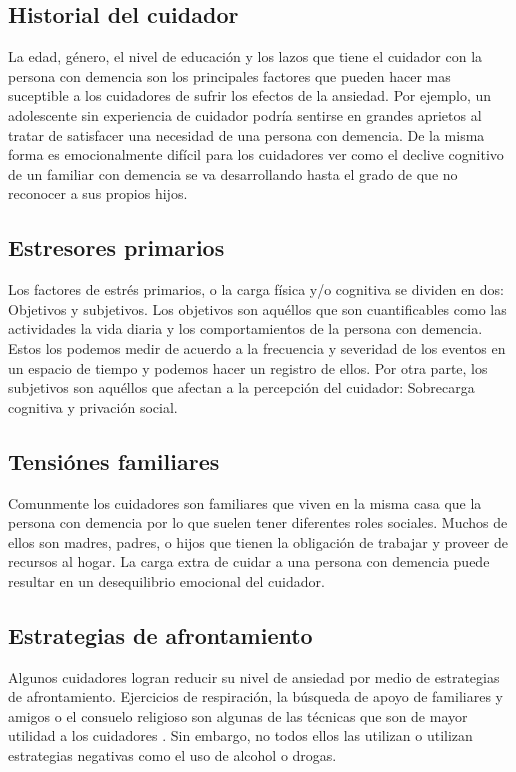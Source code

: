 	\subsection{Historial del cuidador}{\label{secc:modeloAnsiedadCaregivers}}
		La edad, g\'enero, el nivel de educaci\'on y los lazos que tiene el cuidador con la persona con demencia son los principales factores que pueden hacer mas suceptible a los cuidadores de sufrir los efectos de la ansiedad. Por ejemplo, un adolescente sin experiencia de cuidador podr\'ia sentirse en grandes aprietos al tratar de satisfacer una necesidad de una persona con demencia. De la misma forma es emocionalmente dif\'icil para los cuidadores ver como el declive cognitivo de un familiar con demencia se va desarrollando hasta el grado de que no reconocer a sus propios hijos.
	\subsection{Estresores primarios}{\label{secc:modeloAnsiedadStressFactors}}
		Los factores de estr\'es primarios, o la carga f\'isica y/o cognitiva se dividen en dos: Objetivos y subjetivos. Los objetivos son aqu\'ellos que son cuantificables como las actividades la vida diaria y los comportamientos de la persona con demencia. Estos los podemos medir de acuerdo a la frecuencia y severidad de los eventos en un espacio de tiempo y podemos hacer un registro de ellos. Por otra parte, los subjetivos son aqu\'ellos que afectan a la percepci\'on del cuidador: Sobrecarga cognitiva y privaci\'on social.
	\subsection{Tensi\'ones familiares}{\label{secc:modeloAnsiedadSecondaryroles}}
		Comunmente los cuidadores son familiares que viven en la misma casa que la persona con demencia por lo que suelen tener diferentes roles sociales. Muchos de ellos son madres, padres, o hijos que tienen la obligaci\'on de trabajar y proveer de recursos al hogar. La carga extra de cuidar a una persona con demencia puede resultar en un desequilibrio emocional del cuidador.
	
	\subsection{Estrategias de afrontamiento}{\label{secc:modeloAnsiedadCoping}}
	Algunos cuidadores logran reducir su nivel de ansiedad por medio de estrategias de afrontamiento. Ejercicios de respiraci\'on, la b\'usqueda de apoyo de familiares y amigos o el consuelo religioso son algunas de las t\'ecnicas que son de mayor utilidad a los cuidadores \citep{Sharma20121287}.  Sin embargo, no todos ellos las utilizan o utilizan estrategias negativas como el uso de alcohol o drogas.

